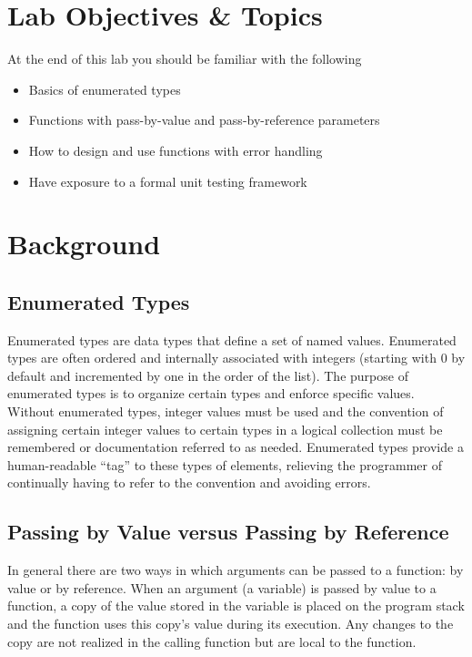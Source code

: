 \documentclass[12pt]{scrartcl}
\begin{document}
\section{Lab Objectives \& Topics}
At the end of this lab you should be familiar with the following
\begin{itemize}
  \item Basics of enumerated types
  \item Functions with pass-by-value and pass-by-reference parameters
  \item How to design and use functions with error handling
  \item Have exposure to a formal unit testing framework 
\end{itemize}

\section{Background}

\subsection*{Enumerated Types}

Enumerated types are data types that define a set of named values.  
Enumerated types are often ordered and internally associated with 
integers (starting with 0 by default and incremented by one in the 
order of the list).  The purpose of enumerated types is to organize 
certain types and enforce specific values.  Without enumerated types, 
integer values must be used and the convention of assigning certain 
integer values to certain types in a logical collection must be remembered 
or documentation referred to as needed.  Enumerated types provide 
a human-readable ``tag'' to these types of elements, relieving the 
programmer of continually having to refer to the convention and avoiding 
errors.

\subsection*{Passing by Value versus Passing by Reference}

In general there are two ways in which arguments can be passed to 
a function: by value or by reference. When an argument (a variable) 
is passed by value to a function, a copy of the value stored in the 
variable is placed on the program stack and the function uses this 
copy's value during its execution.  Any changes to the copy are not 
realized in the calling function but are local to the function.
\end{document}

